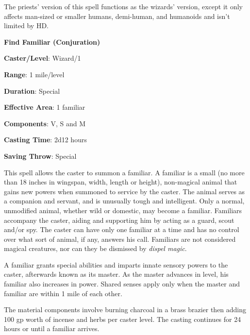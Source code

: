 \begin{multicols}{2}
The priests' version of this spell functions as the wizards' version, except it only affects man-sized or smaller humans, demi-human, and humanoids and isn't limited by HD.

\vspace{1em}

\noindent
\begin{minipage}{\columnwidth}

\noindent \textbf{Find Familiar (Conjuration)}

\noindent \textbf{Caster/Level}: Wizard/1

\noindent \textbf{Range}: 1 mile/level

\noindent \textbf{Duration}: Special

\noindent \textbf{Effective Area}: 1 familiar

\noindent \textbf{Components}: V, S and M

\noindent \textbf{Casting Time}: 2d12 hours

\noindent \textbf{Saving Throw}: Special

\end{minipage}

This spell allows the caster to summon a familiar.  A familiar is a small (no more than 18 inches in wingspan, width, length or height), non-magical animal that gains new powers when summoned to service by the caster.  The animal serves as a companion and servant, and is unusually tough and intelligent.  Only a normal, unmodified animal, whether wild or domestic, may become a familiar.  Familiars accompany the caster, aiding and supporting him by acting as a guard, scout and/or spy.  The caster can have only one familiar at a time and has no control over what sort of animal, if any, answers his call.  Familiars are not considered magical creatures, nor can they be dismissed by \textit{dispel magic}.  

A familiar grants special abilities and imparts innate sensory powers to the caster, afterwards known as its master.  As the master advances in level, his familiar also increases in power.  Shared senses apply only when the master and familiar are within 1 mile of each other.

The material components involve burning charcoal in a brass brazier then adding 100 gp worth of incense and herbs per caster level.  The casting continues for 24 hours or until a familiar arrives.  

\end{multicols}

